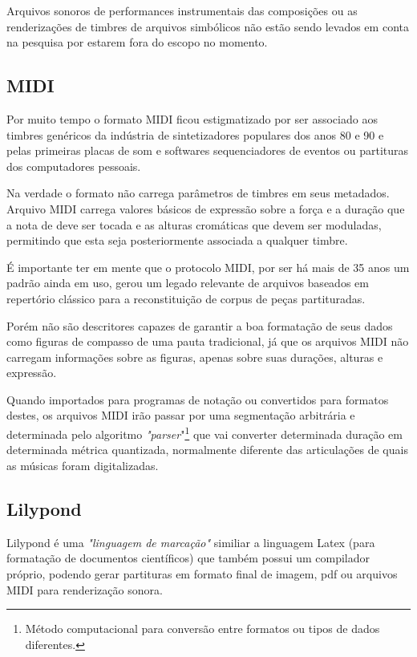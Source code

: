 \documentclass[
	12pt,				%
	openright,			%
	twoside,			%
	a4paper,			%
	english,			%
	french,				%
	spanish,			%
	brazil				%
	]{abntex2}
\begin{document}
Arquivos sonoros de performances instrumentais das composições ou as renderizações de timbres de arquivos simbólicos não estão sendo levados em conta na pesquisa por estarem fora do escopo no momento.



\subsection{MIDI}

Por muito tempo o formato MIDI ficou estigmatizado por ser associado aos timbres genéricos da indústria de sintetizadores populares dos anos 80 e 90 e pelas primeiras placas de som e softwares sequenciadores de eventos ou partituras dos computadores pessoais. 

Na verdade o formato não carrega parâmetros de timbres em seus metadados. Arquivo MIDI carrega valores básicos de expressão sobre a força e a duração que a nota de deve ser tocada e as alturas cromáticas que devem ser moduladas, permitindo que esta seja posteriormente associada a qualquer timbre.

É importante ter em mente que o protocolo MIDI, por ser há mais de 35 anos um padrão ainda em uso, gerou um legado relevante de arquivos baseados em repertório clássico para a reconstituição de corpus de peças partituradas. 

Porém não são descritores capazes de garantir a boa formatação de seus dados como figuras de compasso de uma pauta tradicional, já que os arquivos MIDI não carregam informações sobre as figuras, apenas sobre suas durações, alturas e expressão. 

Quando importados para programas de notação ou convertidos para formatos destes, os arquivos MIDI irão passar por uma segmentação arbitrária e determinada pelo algoritmo \textit{"parser}"\footnote{Método computacional para conversão entre formatos ou tipos de dados diferentes.} que vai converter determinada duração em determinada métrica quantizada, normalmente diferente das articulações de quais as músicas foram digitalizadas.


\subsection{Lilypond}

Lilypond é uma  \textit{"linguagem de marcação"} similiar a linguagem Latex (para formatação de documentos científicos) que também possui um compilador próprio, podendo gerar partituras em formato final de imagem, pdf ou arquivos MIDI para renderização sonora.
\end{document}
